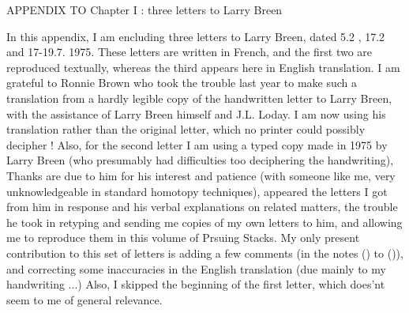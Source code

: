 \begin{center}
APPENDIX TO Chapter I : three letters to Larry Breen
\end{center}

 In this appendix, I am encluding three letters to Larry Breen, dated 5.2 , 17.2 and 17-19.7. 1975. These letters are written in French, and the first two are reproduced textually, whereas the third appears here in English translation. I am grateful to Ronnie Brown who took the trouble last year to make such a translation from a hardly legible  copy of the handwritten letter to Larry Breen, with the assistance of Larry Breen himself and J.L. Loday. I am now using his translation rather than the original letter, which no printer could possibly decipher ! Also, for the second letter I am using a typed copy made in 1975 by Larry Breen (who presumably had difficulties too deciphering the handwriting), Thanks are due to him for his interest and patience (with someone like me, very unknowledgeable in standard homotopy techniques),  appeared  the letters I got from him in response and his verbal explanations on related matters,  the trouble he took in  retyping  and sending me copies of my own letters to him, and allowing me to reproduce them in this volume of Prsuing Stacks. My only present contribution to this set of letters is adding a few comments (in the notes () to ()), and correcting some inaccuracies in the English translation (due mainly to my handwriting ...) Also, I skipped the beginning of the first letter, which does'nt seem to me of general relevance.

